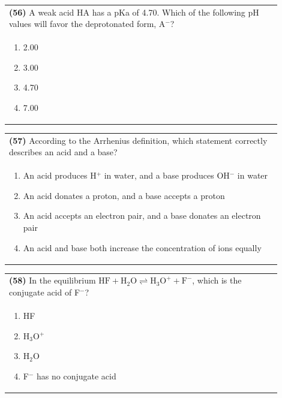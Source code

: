 \documentclass{article}
\begin{document}
\noindent\begin{tabular}{|p{0.9\linewidth}|}
\hline
\textbf{(56)} A weak acid HA has a pKa of 4.70. Which of the following pH values will favor the deprotonated form, A$^-$? \\[0.2cm]
\begin{minipage}{0.85\linewidth}
\begin{enumerate}[label=\alph*.]
\item 2.00 \item 3.00 \item 4.70 \item 7.00
\end{enumerate}
\end{minipage}\\[0.2cm]
\hline
\end{tabular}
\newpage

\noindent\begin{tabular}{|p{0.9\linewidth}|}
\hline
\textbf{(57)} According to the Arrhenius definition, which statement correctly describes an acid and a base?\\[0.2cm]
\begin{minipage}[t]{0.85\linewidth}
\begin{enumerate}[label=\alph*.]
\item An acid produces H$^+$ in water, and a base produces OH$^-$ in water
\item An acid donates a proton, and a base accepts a proton
\item An acid accepts an electron pair, and a base donates an electron pair
\item An acid and base both increase the concentration of ions equally
\end{enumerate}
\end{minipage}\\[0.2cm]
\hline
\end{tabular}

\noindent\begin{tabular}{|p{0.9\linewidth}|}
\hline
\textbf{(58)} In the equilibrium $\text{HF} + \text{H}_2\text{O} \rightleftharpoons \text{H}_3\text{O}^+ + \text{F}^-$, which is the conjugate acid of F$^-$? \\[0.2cm]
\begin{minipage}[t]{0.85\linewidth}
\begin{enumerate}[label=\alph*.]
\item HF
\item H$_3$O$^+$
\item H$_2$O
\item F$^-$ has no conjugate acid
\end{enumerate}
\end{minipage}\\[0.2cm]
\hline
\end{tabular}
\end{document}
